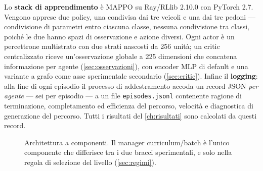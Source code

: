 Lo \textbf{stack di apprendimento} è MAPPO su Ray/RLlib 2.10.0 con
PyTorch 2.7. Vengono apprese due policy, una condivisa dai tre veicoli e
una dai tre pedoni --- condivisione di parametri entro ciascuna classe,
nessuna condivisione tra classi, poiché le due hanno spazi di
osservazione e azione diversi. Ogni actor è un percettrone multistrato
con due strati nascosti da 256 unità; un critic centralizzato riceve
un'osservazione globale a 225 dimensioni che concatena informazione per
agente (\cref{sec:osservazioni}), con encoder MLP di default e una
variante a grafo come asse sperimentale secondario (\cref{sec:critic}).
Infine il \textbf{logging}: alla fine di ogni episodio il processo di
addestramento accoda un record JSON \emph{per agente} --- sei per
episodio --- a un file \texttt{episodes.jsonl} contenente ragione di
terminazione, completamento ed efficienza del percorso, velocità e
diagnostica di generazione del percorso. Tutti i risultati del
\cref{ch:risultati} sono calcolati da questi record.

\begin{figure}[t]
  \centering
  \caption{Architettura a componenti. Il manager curriculum/batch è
  l'unico componente che differisce tra i due bracci sperimentali, e
  solo nella regola di selezione del livello (\cref{sec:regimi}).}
  \label{fig:architettura}
\end{figure}

